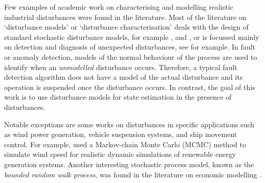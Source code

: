 
Few examples of academic work on characterising and modelling realistic industrial disturbances were found in the literature. Most of the literature on `disturbance models' or `disturbance characterisation' deals with the design of standard stochastic disturbance models, for example \cite{muske_disturbance_2002}, and \cite{pannocchia_robust_2003}, or is focussed mainly on detection and diagnosis of unexpected disturbances, see \cite{thornhill_advances_2007} for example. In fault or anomaly detection, models of the normal behaviour of the process are used to identify when an \textit{unmodelled} disturbance occurs. Therefore, a typical fault detection algorithm does not have a model of the actual disturbance and its operation is suspended once the disturbance occurs. In contrast, the goal of this work is to use disturbance models for state estimation in the presence of disturbances.

Notable exceptions are some works on disturbances in specific applications such as wind power generation, vehicle suspension systems, and ship movement control. For example, \cite{papaefthymiou_mcmc_2008} used a Markov-chain Monte Carlo (MCMC) method to simulate wind speed for realistic dynamic simulations of renewable energy generation systems. Another interesting stochastic process model, known as the \textit{bounded random walk process}, was found in the literature on economic modelling \citep{nicolau_stationary_2002}.

